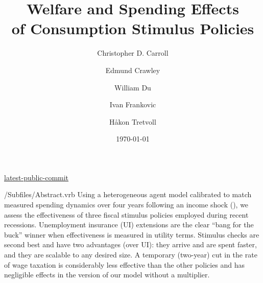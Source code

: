 \documentclass[HAFiscal]{subfiles}
\begin{document}
\hfill{\tiny \href{https://github.com/llorracc/HAFiscal/blob/master/Resources/.git-public-commit}{latest-public-commit}}

\title{Welfare and Spending Effects \\ of Consumption Stimulus Policies}

\author{Christopher D. Carroll\authNum \and Edmund Crawley\authNum \and William Du\authNum \and Ivan Frankovic\authNum \and H{\aa}kon Tretvoll\authNum}

\keywords{}


\date{\today}


\maketitle

\hypertarget{abstract}{}
\begin{verbatimwrite}{\econtexRoot/Subfiles/Abstract.vrb}
  Using a heterogeneous agent model calibrated to match measured spending dynamics over four years following an income shock (\cite{fagereng2021mpc}), we assess the effectiveness of three fiscal stimulus policies employed during recent recessions.  Unemployment insurance (UI) extensions are the clear ``bang for the buck'' winner when effectiveness is measured in utility terms.  Stimulus checks are second best and have two advantages (over UI): they arrive and are spent faster, and they are scalable to any desired size.  A temporary (two-year) cut in the rate of wage taxation is considerably less effective than the other policies and has negligible effects in the version of our model without a multiplier.
\end{verbatimwrite}


\hypertarget{links}{}
\end{document}
